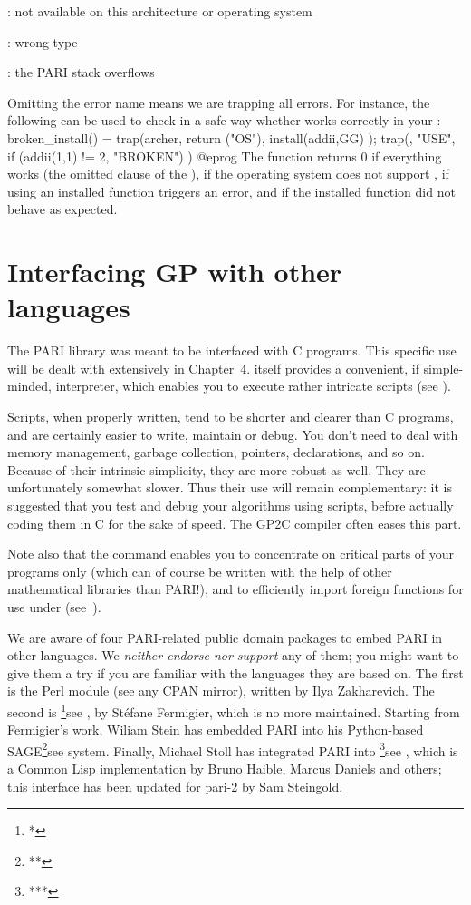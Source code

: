 : not available on this architecture or operating system

: wrong type

: the PARI stack overflows

\noindent Omitting the error name means we are trapping all errors. For
instance, the following can be used to check in a safe way whether
 works correctly in your :
\bprog
broken_install() =
{
  trap(archer, return ("OS"),
    install(addii,GG)
  );
  trap(, "USE",
    if (addii(1,1) != 2, "BROKEN")
  )
}
@eprog
\noindent The function returns 0 if everything works (the omitted 
clause of the ),  if the operating system does not support
,  if using an installed function triggers an error,
and  if the installed function did not behave as expected.

\section{Interfacing GP with other languages}
\noindent
The PARI library was meant to be interfaced with C programs. This specific
use will be dealt with extensively in Chapter~4.  itself provides a
convenient, if simple-minded, interpreter, which enables you to execute
rather intricate scripts (see ).

Scripts, when properly written, tend to be shorter and clearer than C
programs, and are certainly easier to write, maintain or debug. You don't
need to deal with memory management, garbage collection, pointers,
declarations, and so on. Because of their intrinsic simplicity, they are more
robust as well. They are unfortunately somewhat slower. Thus their use will
remain complementary: it is suggested that you test and debug your algorithms
using scripts, before actually coding them in C for the sake of speed.
The GP2C compiler often eases this part.

Note also that the  command enables you to concentrate on
critical parts of your programs only (which can of course be written with the
help of other mathematical libraries than PARI!), and to efficiently import
foreign functions for use under  (see~).

We are aware of four PARI-related public domain packages to embed PARI in
other languages. We \emph{neither endorse nor support} any of them; you might
want to give them a try if you are familiar with the languages they are based
on. The first is the  Perl module (see any CPAN mirror),
written by Ilya Zakharevich. The second is %
\footnote{*}{see },
%
by St\'efane Fermigier, which is no more maintained. Starting from
Fermigier's work, Wiliam Stein has embedded PARI into his Python-based
SAGE\footnote{**}{see }
system. Finally, Michael Stoll has integrated PARI into 
\footnote{***}{see }, which is a Common Lisp
implementation by Bruno Haible, Marcus Daniels and others; this interface has
been updated for pari-2 by Sam Steingold.

